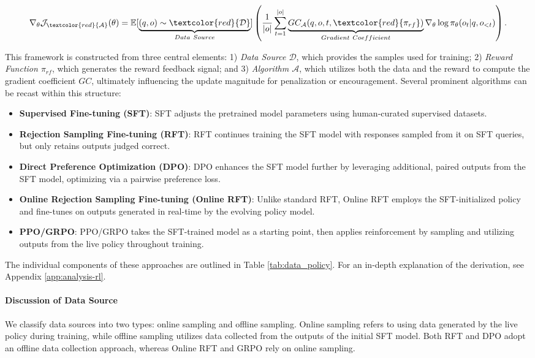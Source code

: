 {\begin{equation}
    \nabla_{\theta}\mathcal{J}_{\textcolor{red}{\mathcal{A}}}(\theta) = \mathbb{E}[\underbrace{(q,o) \sim \textcolor{red}{\mathcal{D}}}_{Data \ Source}]\left( \frac{1}{|o|} \sum_{t=1}^{|o|}  \underbrace{GC_{{\mathcal{A}}}(q, o, t, \textcolor{red}{\pi_{{rf}}})}_{Gradient \ Coefficient}  \nabla_{\theta}\log \pi_{\theta}(o_t | q, o_{<t})\right).
\label{eq:objective}
\end{equation}

This framework is constructed from three central elements: 1) \textit{Data Source $\mathcal{D}$}, which provides the samples used for training; 2) \textit{Reward Function $\pi_{{rf}}$}, which generates the reward feedback signal; and 3) \textit{Algorithm $\mathcal{A}$}, which utilizes both the data and the reward to compute the gradient coefficient $GC$, ultimately influencing the update magnitude for penalization or encouragement. Several prominent algorithms can be recast within this structure:

\begin{itemize}
    \item  \textbf{Supervised Fine-tuning (SFT)}: SFT adjusts the pretrained model parameters using human-curated supervised datasets.
    \item \textbf{Rejection Sampling Fine-tuning (RFT)}: RFT continues training the SFT model with responses sampled from it on SFT queries, but only retains outputs judged correct.
    \item \textbf{Direct Preference Optimization (DPO)}: DPO enhances the SFT model further by leveraging additional, paired outputs from the SFT model, optimizing via a pairwise preference loss.
    \item \textbf{Online Rejection Sampling Fine-tuning (Online RFT)}: Unlike standard RFT, Online RFT employs the SFT-initialized policy and fine-tunes on outputs generated in real-time by the evolving policy model.
    \item \textbf{PPO/GRPO}: PPO/GRPO takes the SFT-trained model as a starting point, then applies reinforcement by sampling and utilizing outputs from the live policy throughout training.
\end{itemize}

The individual components of these approaches are outlined in Table \ref{tab:data_policy}. For an in-depth explanation of the derivation, see Appendix \ref{app:analysis-rl}.

\paragraph{Discussion of Data Source} We classify data sources into two types: online sampling and offline sampling. Online sampling refers to using data generated by the live policy during training, while offline sampling utilizes data collected from the outputs of the initial SFT model. Both RFT and DPO adopt an offline data collection approach, whereas Online RFT and GRPO rely on online sampling.

}
